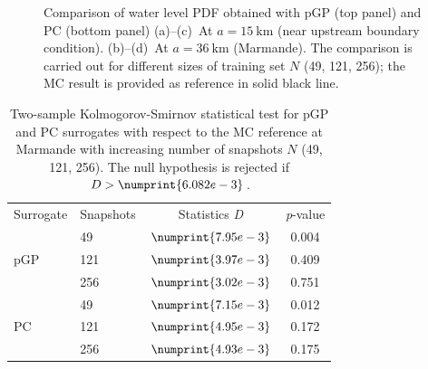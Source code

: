 \begin{figure}[!h]
\caption{Comparison of water level PDF obtained with pGP (top panel) and PC (bottom panel) (a)--(c)~At $a = 15~\text{km}$ (near upstream boundary condition). (b)--(d)~At $a=36~\text{km}$ (Marmande). The comparison is carried out for different sizes of training set $N$ (49, 121, 256); the MC result is provided as reference in solid black line.}
\label{fig:pdf-station-0_9}
\end{figure}

\begin{table}[H]
\centering
\caption{Two-sample Kolmogorov-Smirnov statistical test for pGP and PC surrogates with respect to the MC reference at Marmande with increasing number of snapshots $N$ (49, 121, 256). The null hypothesis is rejected if $D > \numprint{6.082e-3}$.}
\begin{tabular}{llcc}
\toprule
Surrogate & Snapshots & Statistics \emph{D} & \emph{p}-value \\
\cmidrule{3-4}
&49  & $\numprint{7.95e-3}$ & 0.004 \\
pGP&121 & $\numprint{3.97e-3}$ & 0.409 \\
&256 & $\numprint{3.02e-3}$& 0.751\\
\cmidrule{3-4}
&49  & $\numprint{7.15e-3}$ & 0.012 \\
PC&121 & $\numprint{4.95e-3}$ & 0.172  \\
&256 & $\numprint{4.93e-3}$ & 0.175\\
\bottomrule
\end{tabular}
\label{tab:ks}
\end{table}

